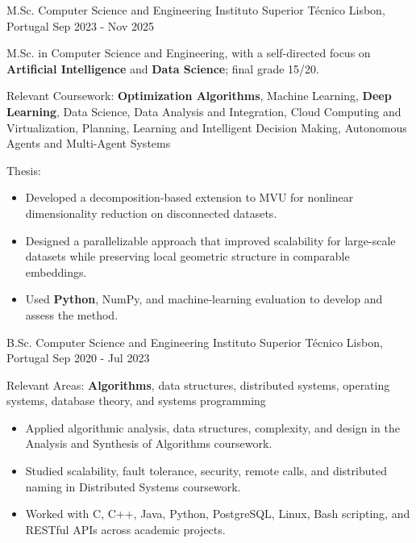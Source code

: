 \begin{cventries}

  \cventry
    {M.Sc. Computer Science and Engineering}
    {Instituto Superior Técnico}
    {Lisbon, Portugal}
    {Sep 2023 - Nov 2025}
    {
      \begin{cvitems}
        \item {M.Sc. in Computer Science and Engineering, with a self-directed focus on \textbf{Artificial Intelligence} and \textbf{Data Science}; final grade 15/20.}
        \item {Relevant Coursework: \textbf{Optimization Algorithms}, Machine Learning, \textbf{Deep Learning}, Data Science, Data Analysis and Integration, Cloud Computing and Virtualization, Planning, Learning and Intelligent Decision Making, Autonomous Agents and Multi-Agent Systems}
        \item {Thesis: }
        \begin{itemize}
          \item {Developed a decomposition-based extension to MVU for nonlinear dimensionality reduction on disconnected datasets.}
          \item {Designed a parallelizable approach that improved scalability for large-scale datasets while preserving local geometric structure in comparable embeddings.}
          \item {Used \textbf{Python}, NumPy, and machine-learning evaluation to develop and assess the method.}
        \end{itemize}
      \end{cvitems}
    }
    {}

  \cventry
    {B.Sc. Computer Science and Engineering}
    {Instituto Superior Técnico}
    {Lisbon, Portugal}
    {Sep 2020 - Jul 2023}
    {
      \begin{cvitems}
        \item {Relevant Areas: \textbf{Algorithms}, data structures, distributed systems, operating systems, database theory, and systems programming}
        \begin{itemize}
          \item {Applied algorithmic analysis, data structures, complexity, and design in the Analysis and Synthesis of Algorithms coursework.}
          \item {Studied scalability, fault tolerance, security, remote calls, and distributed naming in Distributed Systems coursework.}
          \item {Worked with C, C++, Java, Python, PostgreSQL, Linux, Bash scripting, and RESTful APIs across academic projects.}
        \end{itemize}
      \end{cvitems}
    }
    {}

\end{cventries}

